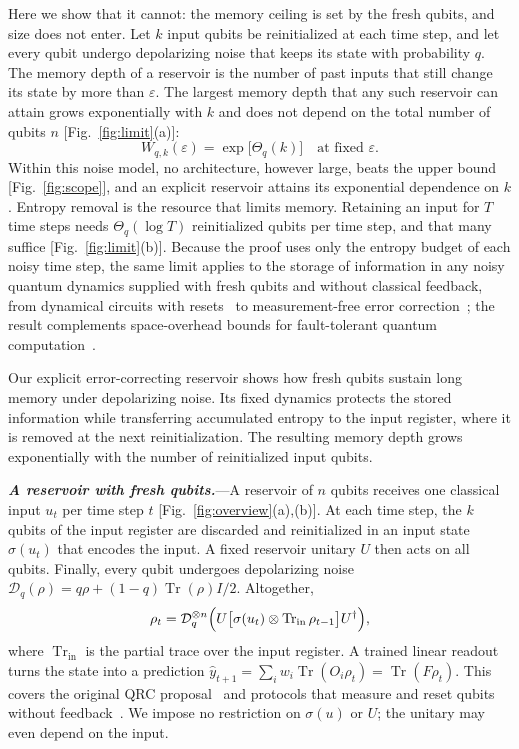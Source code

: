 \documentclass[aps,prl,twocolumn,superscriptaddress,floatfix]{revtex4-2}
\theoremstyle{plain}
\newcommand{\tr}{\operatorname{Tr}}
\newcommand{\cD}{\mathcal D}
\newcommand{\runin}[1]{\textit{\textbf{#1}}---}
\begin{document}
Here we show that it cannot: the memory ceiling is set by the fresh qubits, and size does not enter. Let $k$ input qubits be reinitialized at each time step, and let every qubit undergo depolarizing noise that keeps its state with probability $q$. The memory depth of a reservoir is the number of past inputs that still change its state by more than $\varepsilon$. The largest memory depth that any such reservoir can attain grows exponentially with $k$ and does not depend on the total number of qubits $n$ [Fig.~\ref{fig:limit}(a)]:
\begin{equation}
W_{q,k}(\varepsilon)=\exp\!\big[\Theta_q(k)\big]\quad\text{at fixed }\varepsilon.
\label{eq:main}
\end{equation}
Within this noise model, no architecture, however large, beats the upper bound [Fig.~\ref{fig:scope}], and an explicit reservoir attains its exponential dependence on $k$. Entropy removal is the resource that limits memory. Retaining an input for $T$ time steps needs $\Theta_q(\log T)$ reinitialized qubits per time step, and that many suffice [Fig.~\ref{fig:limit}(b)]. Because the proof uses only the entropy budget of each noisy time step, the same limit applies to the storage of information in any noisy quantum dynamics supplied with fresh qubits and without classical feedback, from dynamical circuits with resets~\cite{Yasuda2023,Hu2024} to measurement-free error correction~\cite{Heussen2024}; the result complements space-overhead bounds for fault-tolerant quantum computation~\cite{Fawzi2022}.

Our explicit error-correcting reservoir shows how fresh qubits sustain long memory under depolarizing noise. Its fixed dynamics protects the stored information while transferring accumulated entropy to the input register, where it is removed at the next reinitialization. The resulting memory depth grows exponentially with the number of reinitialized input qubits.

\runin{A reservoir with fresh qubits.}A reservoir of $n$ qubits receives one classical input $u_t$ per time step $t$ [Fig.~\ref{fig:overview}(a),(b)]. At each time step, the $k$ qubits of the input register are discarded and reinitialized in an input state $\sigma(u_t)$ that encodes the input. A fixed reservoir unitary $U$ then acts on all qubits. Finally, every qubit undergoes depolarizing noise $\cD_q(\rho)=q\rho+(1-q)\tr(\rho)I/2$. Altogether,
\begin{equation}
\rho_t=\cD_q^{\otimes n}\Bigl(U\bigl[\sigma(u_t)\otimes\tr_{\mathrm{in}}\rho_{t-1}\bigr]U^\dagger\Bigr),
\label{eq:model}
\end{equation}
where $\tr_{\mathrm{in}}$ is the partial trace over the input register. A trained linear readout turns the state into a prediction $\hat y_{t+1}=\sum_iw_i\tr(O_i\rho_t)=\tr(F\rho_t)$. This covers the original QRC proposal~\cite{Fujii2017} and protocols that measure and reset qubits without feedback~\cite{Yasuda2023,Hu2024}. We impose no restriction on $\sigma(u)$ or $U$; the unitary may even depend on the input.
\end{document}
